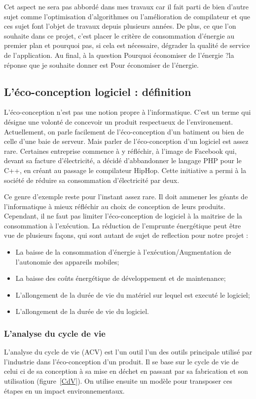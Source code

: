 \documentclass[a4paper, 11pt]{report}
\begin{document}
Cet aspect ne sera pas abbordé dans mes travaux car il fait parti de bien d'autre sujet comme l'optimisation d'algorithmes ou l'amélioration de compilateur et que ces sujet font l'objet de travaux depuis plusieurs années. De plus, ce que l'on souhaite dans ce projet, c'est placer le critère de consommation d'énergie au premier plan et pourquoi pas, si cela est nécessaire, dégrader la qualité de service de l'application. Au final, à la question \og Pourquoi économiser de l'énergie ?\fg la réponse que je souhaite donner est \og Pour économiser de l'énergie\fg.
		
		\subsection{L'éco-conception logiciel : définition}
L'éco-conception n'est pas une notion propre à l'informatique. C'est un terme qui désigne une volonté de concevoir un produit respectueux de l'environement. Actuellement, on parle facilement de l'éco-conception d'un batiment ou bien de celle d'une baie de serveur. Mais parler de l'éco-conception d'un logiciel est assez rare. Certaines entreprise commence à y réfléchir, à l'image de Facebook qui, devant sa facture d'électricité, a décidé d'abbandonner le langage PHP pour le C++, en créant au passage le compilateur HipHop. Cette initiative a permi à la société de réduire sa consommation d'électricité par deux.%

Ce genre d'exemple reste pour l'instant assez rare. Il doit ammener les géants de l'informatique à mieux réfléchir au choix de conception de leurs produits. Cependant, il ne faut pas limiter l'éco-conception de logiciel à la maitrise de la consommation à l'exécution. La réduction de l’emprunte énergétique peut être vue de plusieurs façons, qui sont autant de sujet de reflection pour notre projet :
\begin{itemize}
	\item La baisse de la consommation d’énergie à l'exécution/Augmentation de l’autonomie des appareils mobiles;
	\item La baisse des coûts énergétique de développement et de maintenance;
	\item L'allongement de la durée de vie du matériel sur lequel est executé le logiciel;
	\item L'allongement de la durée de vie du logiciel.
\end{itemize}

			\subsubsection{L'analyse du cycle de vie}
L'analyse du cycle de vie (ACV) est l'un outil l'un des outils principale utilisé par l'industrie dans l'éco-conception d'un produit. Il se base sur le cycle de vie de celui ci de sa conception à sa mise en déchet en passant par sa fabrication et son utilisation (figure~\ref{CdV}). On utilise ensuite un modèle pour transposer ces étapes en un impact environnementaux.
\end{document}
